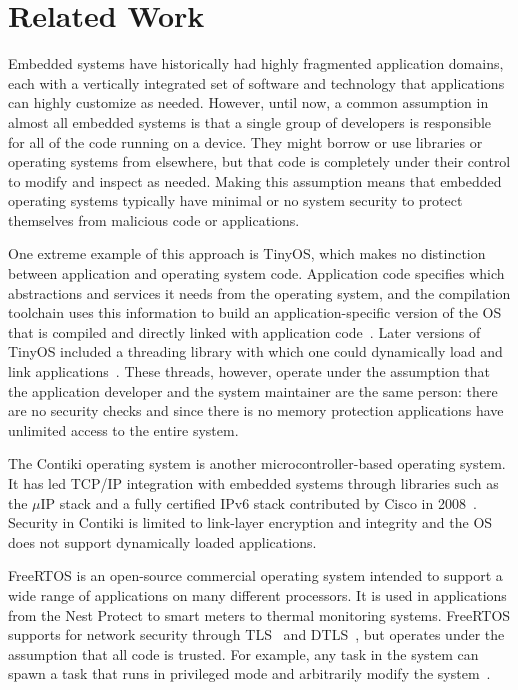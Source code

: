 \section{Related Work}

Embedded systems have historically had highly fragmented application domains,
each with a vertically integrated set of software and technology that
applications can highly customize as needed. However, until now, a common
assumption in almost all embedded systems is that a single group of developers
is responsible for all of the code running on a device. They might borrow
or use libraries or operating systems from elsewhere, but that code is 
completely under their control to modify and inspect as needed. Making
this assumption means that embedded operating systems typically have
minimal or no system security to protect themselves from malicious code
or applications.

One extreme example of this approach is TinyOS, which makes no
distinction between application and operating system code. Application
code specifies which abstractions and services it needs from the
operating system, and the compilation toolchain uses this information
to build an application-specific version of the OS that is compiled
and directly linked with application code~\cite{tinyos}. Later
versions of TinyOS included a threading library with which one could
dynamically load and link applications~\cite{tosthreads}. These
threads, however, operate under the assumption that the application
developer and the system maintainer are the same person: there are no
security checks and since there is no memory protection applications
have unlimited access to the entire system.

The Contiki operating system is another microcontroller-based
operating system. It has led TCP/IP integration with embedded systems
through libraries such as the $\mu$IP stack and a fully
certified IPv6 stack contributed by Cisco in 2008~\cite{contiki}. 
Security in Contiki is limited to
link-layer encryption and integrity and the OS does not support
dynamically loaded applications. 

FreeRTOS is an open-source commercial operating system intended to 
support a wide range of applications on many different processors. It
is used in applications from the Nest Protect to smart meters to
thermal monitoring systems. FreeRTOS supports for network security
through TLS~\cite{tls} and DTLS~\cite{dtls}, but operates under the
assumption that all code is trusted. For example, any task in the system
can spawn a task that runs in privileged mode and arbitrarily modify
the system~\cite{rtos-tasks,rtos-sec}.

